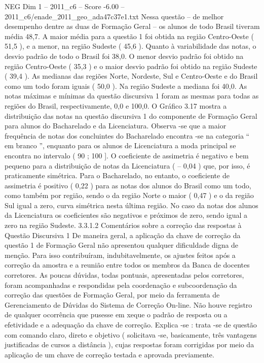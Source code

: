 \begin{textsample}{NEG Dim 1 – 2011\_c6 – Score -6.00 – 2011\_c6/enade\_2011\_geo\_ada47c37e1.txt}
Nessa questão – de melhor desempenho dentre as duas de Formação Geral – os alunos de todo Brasil tiveram média 48,7.
A maior média para a questão 1 foi obtida na região Centro-Oeste ( 51,5 ), e a menor, na região Sudeste ( 45,6 ).
Quanto à variabilidade das notas, o desvio padrão de todo o Brasil foi 38,0.
O menor desvio padrão foi obtido na região Centro-Oeste ( 35,3 ) e o maior desvio padrão foi obtido na região Sudeste ( 39,4 ).
As medianas das regiões Norte, Nordeste, Sul e Centro-Oeste e do Brasil como um todo foram iguais ( 50,0 ).
Na região Sudeste a mediana foi 40,0.
As notas máximas e mínimas da questão discursiva 1 foram as mesmas para todas as regiões do Brasil, respectivamente, 0,0 e 100,0.
O Gráfico 3.17 mostra a distribuição das notas na questão discursiva 1 do componente de Formação Geral para alunos do Bacharelado e da Licenciatura.
Observa -se que a maior frequência de notas dos concluintes do Bacharelado encontra -se na categoria “ em branco ”, enquanto para os alunos de Licenciatura a moda principal se encontra no intervalo ( 90 ; 100 ].
O coeficiente de assimetria é negativo e bem pequeno para a distribuição de notas da Licenciatura ( – 0,04 ) que, por isso, é praticamente simétrica.
Para o Bacharelado, no entanto, o coeficiente de assimetria é positivo ( 0,22 ) para as notas dos alunos do Brasil como um todo, como também por região, sendo o da região Norte o maior ( 0,47 ) e o da região Sul igual a zero, curva simétrica nesta última região.
No caso da notas dos alunos da Licenciatura os coeficientes são negativos e próximos de zero, sendo igual a zero na região Sudeste. 3.3.1.2 Comentários sobre a correção das respostas à Questão Discursiva 1 De maneira geral, a aplicação da chave de correção da questão 1 de Formação Geral não apresentou qualquer dificuldade digna de menção.
Para isso contribuíram, indubitavelmente, os ajustes feitos após a correção da amostra e a reunião entre todos os membros da Banca de docentes corretores.
As poucas dúvidas, todas pontuais, apresentadas pelos corretores, foram acompanhadas e respondidas pela coordenação e subcoordenação da correção das questões de Formação Geral, por meio da ferramenta de Gerenciamento de Dúvidas do Sistema de Correção On-line.
Não houve registro de qualquer ocorrência que pusesse em xeque o padrão de resposta ou a efetividade e a adequação da chave de correção.
Explica -se : trata -se de questão com comando claro, direto e objetivo ( solicitava -se, basicamente, três vantagens justificadas de cursos a distância ), cujas respostas foram corrigidas por meio da aplicação de um chave de correção testada e aprovada previamente.

\end{textsample}

